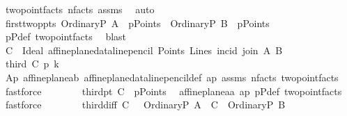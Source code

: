 \begin{isabellebody}
\ two{\isacharunderscore}{\kern0pt}point{\isacharunderscore}{\kern0pt}facts\ n{\isacharunderscore}{\kern0pt}facts\ assms\ \isamarkupfalse%
\ auto\isanewline
\ \ \ \ \ \ \isamarkupfalse%
\ first{\isacharunderscore}{\kern0pt}two{\isacharunderscore}{\kern0pt}ppts{\isacharcolon}{\kern0pt}\ {\isachardoublequoteopen}{\isacharparenleft}{\kern0pt}OrdinaryP\ A{\isacharparenright}{\kern0pt}\ {\isasymin}\ pPoints\ {\isasymand}\ {\isacharparenleft}{\kern0pt}OrdinaryP\ B{\isacharparenright}{\kern0pt}\ {\isasymin}\ pPoints{\isachardoublequoteclose}\ \isamarkupfalse%
\ pPdef\ two{\isacharunderscore}{\kern0pt}point{\isacharunderscore}{\kern0pt}facts\ \isamarkupfalse%
\ blast\isanewline
\ \ \ \ \ \ \isamarkupfalse%
\ {\isacharquery}{\kern0pt}C\ {\isacharequal}{\kern0pt}\ {\isachardoublequoteopen}Ideal\ {\isacharparenleft}{\kern0pt}affine{\isacharunderscore}{\kern0pt}plane{\isacharunderscore}{\kern0pt}data{\isachardot}{\kern0pt}line{\isacharunderscore}{\kern0pt}pencil\ Points\ Lines\ {\isacharparenleft}{\kern0pt}incid{\isacharparenright}{\kern0pt}\ {\isacharparenleft}{\kern0pt}join\ A\ B{\isacharparenright}{\kern0pt}{\isacharparenright}{\kern0pt}{\isachardoublequoteclose}\isanewline
\ \ \ \ \ \ \isamarkupfalse%
\ third{\isacharcolon}{\kern0pt}\ {\isachardoublequoteopen}{\isacharquery}{\kern0pt}C\ p{\isasymlhd}\ k{\isachardoublequoteclose}\isanewline
\ \ \ \ \ \ \isamarkupfalse%
\ Ap{}{}\ affine{\isacharunderscore}{\kern0pt}plane{\isachardot}{\kern0pt}a{}b\ affine{\isacharunderscore}{\kern0pt}plane{\isacharunderscore}{\kern0pt}data{\isachardot}{\kern0pt}line{\isacharunderscore}{\kern0pt}pencil{\isacharunderscore}{\kern0pt}def\ ap\ assms\ n{\isacharunderscore}{\kern0pt}facts\ two{\isacharunderscore}{\kern0pt}point{\isacharunderscore}{\kern0pt}facts\ \isamarkupfalse%
\ fastforce\isanewline
\ \ \ \ \ \ \isamarkupfalse%
\ third{\isacharunderscore}{\kern0pt}pt{\isacharcolon}{\kern0pt}\ {\isachardoublequoteopen}{\isacharquery}{\kern0pt}C\ {\isasymin}\ pPoints{\isachardoublequoteclose}\ \isamarkupfalse%
\ affine{\isacharunderscore}{\kern0pt}plane{\isachardot}{\kern0pt}a{}a\ ap\ pPdef\ two{\isacharunderscore}{\kern0pt}point{\isacharunderscore}{\kern0pt}facts\ \isamarkupfalse%
\ fastforce\isanewline
\ \ \ \ \ \ \isamarkupfalse%
\ third{\isacharunderscore}{\kern0pt}diff{\isacharcolon}{\kern0pt}\ {\isachardoublequoteopen}{\isacharquery}{\kern0pt}C\ {\isasymnoteq}\ \ {\isacharparenleft}{\kern0pt}OrdinaryP\ A{\isacharparenright}{\kern0pt}\ {\isasymand}\ {\isacharquery}{\kern0pt}C\ {\isasymnoteq}\ {\isacharparenleft}{\kern0pt}OrdinaryP\ B{\isacharparenright}{\kern0pt}{\isachardoublequoteclose}\ \isamarkupfalse%

\end{isabellebody}
